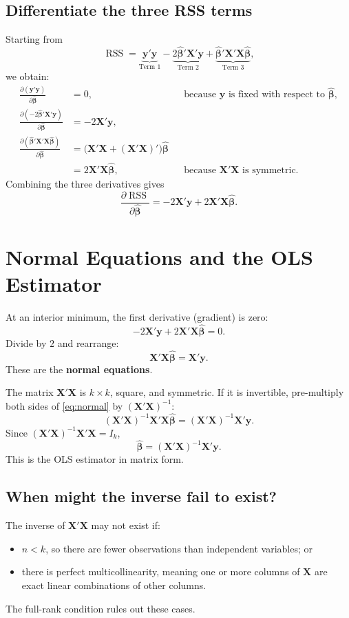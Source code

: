 \documentclass[11pt]{article}
\newcommand{\bhat}{\hat{\boldsymbol{\beta}}}
\newcommand{\XX}{\mathbf{X}}
\newcommand{\yy}{\mathbf{y}}
\newcommand{\RSS}{\operatorname{RSS}}
\begin{document}
\subsection{Differentiate the three RSS terms}
Starting from
\[
\RSS=\underbrace{\yy'\yy}_{\text{Term 1}}
-\underbrace{2\bhat'\XX'\yy}_{\text{Term 2}}
+\underbrace{\bhat'\XX'\XX\bhat}_{\text{Term 3}},
\]
we obtain:
\begin{align*}
\frac{\partial(\yy'\yy)}{\partial\bhat}&=0,
&&\text{because $\yy$ is fixed with respect to $\bhat$},\\
\frac{\partial(-2\bhat'\XX'\yy)}{\partial\bhat}&=-2\XX'\yy,\\
\frac{\partial(\bhat'\XX'\XX\bhat)}{\partial\bhat}
&=\bigl(\XX'\XX+(\XX'\XX)'\bigr)\bhat\\
&=2\XX'\XX\bhat,
&&\text{because $\XX'\XX$ is symmetric.}
\end{align*}
Combining the three derivatives gives
\begin{equation}
    \boxed{\frac{\partial\RSS}{\partial\bhat}
    =-2\XX'\yy+2\XX'\XX\bhat.}
    \label{eq:rss-gradient}
\end{equation}

\section{Normal Equations and the OLS Estimator}

At an interior minimum, the first derivative (gradient) is zero:
\[
-2\XX'\yy+2\XX'\XX\bhat=0.
\]
Divide by $2$ and rearrange:
\begin{equation}
    \boxed{\XX'\XX\bhat=\XX'\yy.}
    \label{eq:normal}
\end{equation}
These are the \textbf{normal equations}.

The matrix $\XX'\XX$ is $k\times k$, square, and symmetric. If it is invertible, pre-multiply both sides of \eqref{eq:normal} by $(\XX'\XX)^{-1}$:
\[
(\XX'\XX)^{-1}\XX'\XX\bhat=(\XX'\XX)^{-1}\XX'\yy.
\]
Since $(\XX'\XX)^{-1}\XX'\XX=I_k$,
\begin{equation}
    \boxed{\bhat=(\XX'\XX)^{-1}\XX'\yy.}
    \label{eq:ols-estimator}
\end{equation}
This is the OLS estimator in matrix form.

\subsection{When might the inverse fail to exist?}
The inverse of $\XX'\XX$ may not exist if:
\begin{itemize}
    \item $n<k$, so there are fewer observations than independent variables; or
    \item there is perfect multicollinearity, meaning one or more columns of $\XX$ are exact linear combinations of other columns.
\end{itemize}
The full-rank condition rules out these cases.
\end{document}
